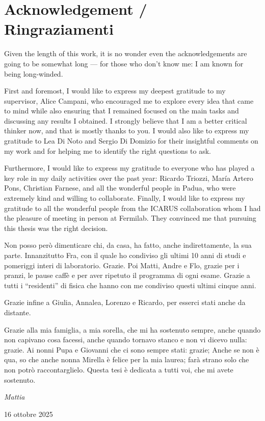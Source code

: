 \chapter*{Acknowledgement / Ringraziamenti}

Given the length of this work, it is no wonder even the acknowledgements are going to be somewhat long --- for those who don't know me: I am known for being long-winded. 

First and foremost, I would like to express my deepest gratitude to my supervisor, Alice Campani, who encouraged me to explore every idea that came to mind while also ensuring that I remained focused on the main tasks and discussing any results I obtained. I strongly believe that I am a better critical thinker now, and that is mostly thanks to you. 
I would also like to express my gratitude to Lea Di Noto and Sergio Di Domizio for their insightful comments on my work and for helping me to identify the right questions to ask. 

Furthermore, I would like to express my gratitude to everyone who has played a key role in my daily activities over the past year: Ricardo Triozzi, María Artero Pons, Christian Farnese, and all the wonderful people in Padua, who were extremely kind and willing to collaborate. 
Finally, I would like to express my gratitude to all the wonderful people from the ICARUS collaboration whom I had the pleasure of meeting in person at Fermilab. They convinced me that pursuing this thesis was the right decision. 


Non posso però dimenticare chi, da casa, ha fatto, anche indirettamente, la sua parte. Innanzitutto Fra, con il quale ho condiviso gli ultimi 10 anni di studi e pomeriggi interi di laboratorio. Grazie. Poi Matti, Andre e Flo, grazie per i pranzi, le pause caffè e per aver ripetuto il programma di ogni esame. 
Grazie a tutti i ``residenti'' di fisica che hanno con me condiviso questi ultimi cinque anni.

Grazie infine a Giulia, Annalea, Lorenzo e Ricardo, per esserci stati anche da distante.

Grazie alla mia famiglia, a mia sorella, che mi ha sostenuto sempre, anche quando non capivano cosa facessi, anche quando tornavo stanco e non vi dicevo nulla: grazie. Ai nonni Pupa e Giovanni che ci sono sempre stati: grazie; Anche se non è qua, so che anche nonna Mirella è felice per la mia laurea; farà strano solo che non potrò raccontarglielo. Questa tesi è dedicata a tutti voi, che mi avete sostenuto. 

\begin{flushright}
    \emph{Mattia}\par
    16 ottobre 2025
\end{flushright}